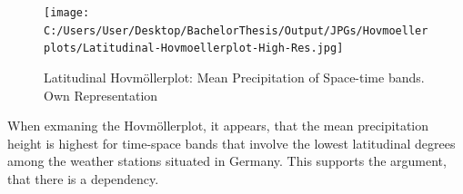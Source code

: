 \documentclass[
  12pt,
]{article}
\begin{document}
\begin{figure}[h]
\texttt{[image: C:/Users/User/Desktop/BachelorThesis/Output/JPGs/Hovmoellerplots/Latitudinal-Hovmoellerplot-High-Res.jpg]}
\caption{\label{latitudinal_hovmoellerplot}Latitudinal Hovmöllerplot: Mean Precipitation of Space-time bands. Own Representation}
\end{figure}

When exmaning the Hovmöllerplot, it appears, that the mean precipitation
height is highest for time-space bands that involve the lowest
latitudinal degrees among the weather stations situated in Germany. This
supports the argument, that there is a dependency.

\renewcommand\refname{References}
  
\end{document}
